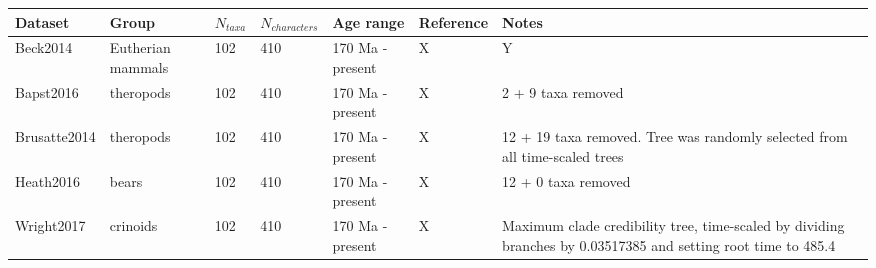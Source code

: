 
\begin{tabular}[t]{l l l l l l p{6cm}}		

\hline
\textbf{Dataset} & \textbf{Group} & \textbf{$N_{taxa}$} & \textbf{$N_{characters}$} & \textbf{Age range} & \textbf{Reference} & \textbf{Notes} \\
\hline
Beck2014 & Eutherian mammals & 102 & 410 & 170 Ma - present & X & Y \\
Bapst2016 & theropods & 102 & 410 & 170 Ma - present & X & 2 + 9 taxa removed\\
Brusatte2014 & theropods & 102 & 410 & 170 Ma - present & X & 12 + 19 taxa removed. Tree was randomly selected from all time-scaled trees\\
Heath2016 & bears & 102 & 410 & 170 Ma - present & X & 12 + 0 taxa removed\\
Wright2017 & crinoids & 102 & 410 & 170 Ma - present & X & Maximum clade credibility tree, time-scaled by dividing branches by 0.03517385 and setting root time to 485.4\\
\hline
\end{tabular}